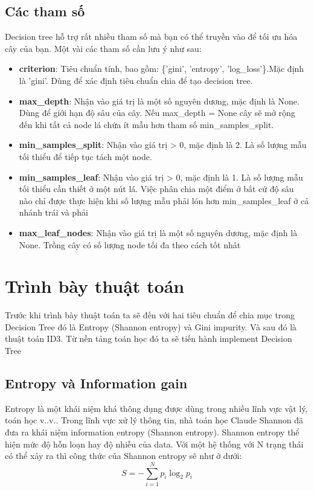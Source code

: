 \documentclass[lineno]{biometrika}
\begin{document}
\subsection{Các tham số}
Decision tree hỗ trợ rất nhiều tham số mà bạn có thể truyền vào để
tối ưu hóa cây của bạn. Một vài các tham số cần lưu ý như sau:
\begin{itemize}
\item \textbf{criterion}: Tiêu chuẩn tính, bao gồm: \{’gini’, ’entropy’, ’log\_loss’\}.Mặc định là ’gini’. Dùng để xác định tiêu chuẩn chia để tạo decision tree.
\item \textbf{max\_depth}: Nhận vào giá trị là một số nguyên dương, mặc định
là None. Dùng để giới hạn độ sâu của cây. Nếu max\_depth = None
cây sẽ mở rộng đến khi tất cả node lá chứa ít mẫu hơn tham số
min\_samples\_split.
\item \textbf{min\_samples\_split}: Nhận vào giá trị > 0, mặc định là 2. Là số lượng mẫu tối thiểu để tiếp tục tách một node.
\item \textbf{min\_samples\_leaf}: Nhận vào giá trị > 0, mặc định là 1. Là số lượng mẫu tối thiểu cần thiết ở một nút lá.
Việc phân chia một điểm ở bất cứ độ sâu nào chỉ được thực hiện
khi số lượng mẫu phải lón hơn min\_samples\_leaf ở cả nhánh trái
và phải
\item \textbf{max\_leaf\_nodes}: Nhận vào giá trị là một số nguyên dương, mặc
định là None. Trồng cây có số lượng node tối đa theo cách tốt nhât
\end{itemize}
\section{Trình bày thuật toán}
Trước khi trình bày thuật toán ta sẽ đến với hai tiêu chuẩn để chia mục trong Decision Tree đó là Entropy (Shannon entropy) và Gini impurity. Và sau đó là thuật toán ID3. Từ nền tảng toán học đó ta sẽ tiến hành implement Decision Tree
\subsection{Entropy và Information gain }
Entropy là một khái niệm khá thông dụng được dùng trong nhiều lĩnh vực vật lý, toán học v..v.. Trong lĩnh vực xử lý thông tin, nhà toán học Claude Shannon đã đưa ra khái niệm information entropy (Shannon entropy). Shannon entropy thể hiện mức độ hỗn loạn hay độ nhiễu của data. Với một hệ thống với N trạng thái có thể xảy ra thì công thức của Shannon entropy sẽ như ở dưới:
    $$  S= -\sum_{i=1}^N p_i \log_{2} p_i   $$
 
\end{document}
